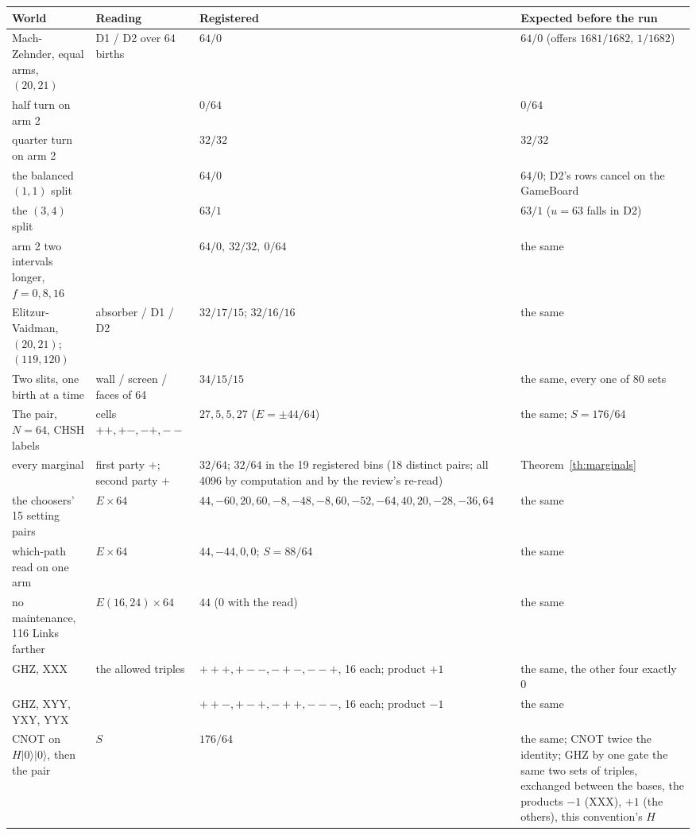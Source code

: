 \documentclass[11pt]{article}
\theoremstyle{definition}
\begin{document}
\begin{table}[H]\centering\footnotesize\setlength{\tabcolsep}{3pt}
\begin{tabular}{p{1.4in}p{1.1in}p{1.3in}p{2.1in}}
\toprule
World & Reading & Registered & Expected before the run\\
\midrule
Mach-Zehnder, equal arms, $(20, 21)$ & D1 / D2 over 64 births & $64 / 0$ & $64 / 0$ (offers $1681/1682$, $1/1682$)\\
half turn on arm 2 & & $0 / 64$ & $0 / 64$\\
quarter turn on arm 2 & & $32 / 32$ & $32 / 32$\\
the balanced $(1, 1)$ split & & $64 / 0$ & $64 / 0$; D2's rows cancel on the GameBoard\\
the $(3, 4)$ split & & $63 / 1$ & $63 / 1$ ($u = 63$ falls in D2)\\
arm 2 two intervals longer, $f = 0, 8, 16$ & & $64/0,\ 32/32,\ 0/64$ & the same\\
Elitzur-Vaidman, $(20, 21)$; $(119, 120)$ & absorber / D1 / D2 & $32/17/15$; $32/16/16$ & the same\\
Two slits, one birth at a time & wall / screen / faces of 64 & $34 / 15 / 15$ & the same, every one of 80 sets\\
The pair, $N = 64$, CHSH labels & cells $++, +-, -+, --$ & $27, 5, 5, 27$ ($E = \pm 44/64$) & the same; $S = 176/64$\\
every marginal & first party $+$; second party $+$ & $32/64$; $32/64$ in the 19 registered bins (18 distinct pairs; all 4096 by computation and by the review's re-read) & Theorem~\ref{th:marginals}\\
the choosers' 15 setting pairs & $E \times 64$ & $44, -60, 20, 60, -8, -48, -8, 60, -52, -64, 40, 20, -28, -36, 64$ & the same\\
which-path read on one arm & $E \times 64$ & $44, -44, 0, 0$; $S = 88/64$ & the same\\
no maintenance, 116 Links farther & $E(16, 24) \times 64$ & $44$ ($0$ with the read) & the same\\
GHZ, XXX & the allowed triples & $+++, +--, -+-, --+$, 16 each; product $+1$ & the same, the other four exactly 0\\
GHZ, XYY, YXY, YYX & & $++-, +-+, -++, ---$, 16 each; product $-1$ & the same\\
CNOT on $H|0\rangle|0\rangle$, then the pair & $S$ & $176/64$ & the same; CNOT twice the identity; GHZ by one gate the same two sets of triples, exchanged between the bases, the products $-1$ (XXX), $+1$ (the others), this convention's $H$\\

\end{tabular}
\end{table}
\end{document}
